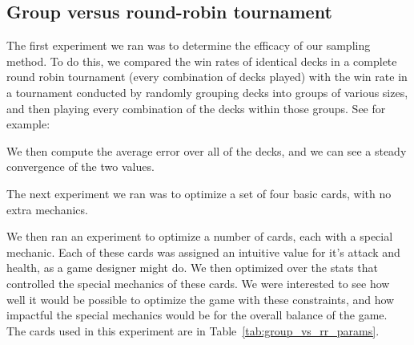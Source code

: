 \subsection{Group versus round-robin tournament}

The first experiment we ran was to determine the efficacy of our sampling method. To do this, we compared the win rates of identical decks in a complete round robin tournament (every combination of decks played) with the win rate in a tournament conducted by randomly grouping decks into groups of various sizes, and then playing every combination of the decks within those groups. See for example:


We then compute the average error over all of the decks, and we can see a steady convergence of the two values.


The next experiment we ran was to optimize a set of four basic cards, with no extra mechanics. 

We then ran an experiment to optimize a number of cards, each with a special mechanic. Each of these cards was assigned an intuitive value for it's attack and health, as a game designer might do. We then optimized over the stats that controlled the special mechanics of these cards. We were interested to see how well it would be possible to optimize the game with these constraints, and how impactful the special mechanics would be for the overall balance of the game. The cards used in this experiment are in Table~\ref{tab:group_vs_rr_params}.

